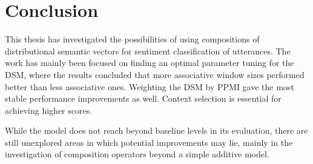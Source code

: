
\chapter{Conclusion}\label{conclusion}

This thesis has investigated the possibilities of using compositions of distributional semantic vectors for sentiment classification of utterances. The work has mainly been focused on finding an optimal parameter tuning for the DSM, where the results concluded that more associative window sizes performed better than less associative ones. Weighting the DSM by PPMI gave the most stable performance improvements as well. Context selection is essential for achieving higher scores.

While the model does not reach beyond baseline levels in its evaluation, there are still unexplored areas in which potential improvements may lie, mainly in the investigation of composition operators beyond a simple additive model.

